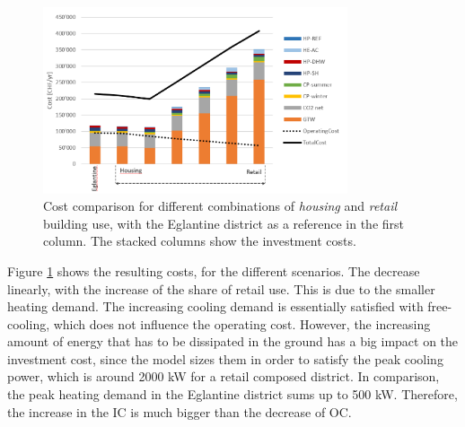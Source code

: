 \documentclass{article}
\begin{document}

\begin{figure}[htp]
	\centering
	\includegraphics[width=0.8\textwidth]{CU_SA_TC.png}
	\caption{Cost comparison for different combinations of \textit{housing} and \textit{retail} building use, with the Eglantine district as a reference in the first column. The stacked columns show the investment costs.}
	\label{fig:CU_TC}
\end{figure}

Figure \ref{fig:CU_TC} shows the resulting costs, for the different scenarios. The decrease linearly, with the increase of the share of retail use. This is due to the smaller heating demand. The increasing cooling demand is essentially satisfied with free-cooling, which does not influence the operating cost. However, the increasing amount of energy that has to be dissipated in the ground has a big impact on the investment cost, since the model sizes them in order to satisfy the peak cooling power, which is around 2000 kW for a retail composed district. In comparison, the peak heating demand in the Eglantine district sums up to 500 kW. Therefore, the increase in the IC is much bigger than the decrease of OC. 
\end{document}
